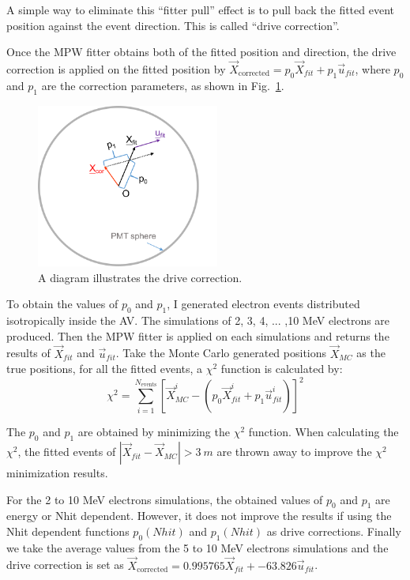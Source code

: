 A simple way to eliminate this ``fitter pull'' effect is to pull back the fitted event position against the event direction. This is called ``drive correction''.   

Once the MPW fitter obtains both of the fitted position and direction, the drive correction is applied on the fitted position by $\vec{X}_{\mathrm{corrected}} = p_0\vec{X}_{fit}+p_1\vec{u}_{fit}$, where $p_0$ and $p_1$ are the correction parameters, as shown in Fig.~\ref{drivecor}.
\begin{figure}[!htb]
	\centering
	\includegraphics[width=6cm]{driveCor.png}
	\caption{ A diagram illustrates the drive correction.}
	\label{drivecor}
\end{figure}

To obtain the values of $p_0$ and $p_1$, I generated electron events distributed isotropically inside the AV. The simulations of 2, 3, 4, ... ,10 MeV electrons are produced. Then the MPW fitter is applied on each simulations and returns the results of $\vec{X}_{fit}$ and $\vec{u}_{fit}$. Take the Monte Carlo generated positions $\vec{X}_{MC}$ as the true positions, for all the fitted events, a $\chi^2$ function is calculated by:
\[
\chi^2 = \sum_{i=1}^{N_{\mathrm{events}}}[\vec{X}^i_{MC}-(p_0\vec{X}^i_{fit}+p_1\vec{u}^i_{fit})]^2
\]

The $p_0$ and $p_1$ are obtained by minimizing the $\chi^2$ function. When calculating the $\chi^2$, the fitted events of $|\vec{X}_{fit}-\vec{X}_{MC}|>3~m$ are thrown away to improve the $\chi^2$ minimization results.

For the 2 to 10 MeV electrons simulations, the obtained values of $p_0$ and $p_1$ are energy or Nhit dependent. However, it does not improve the results if using the Nhit dependent functions $p_0(Nhit)$ and $p_1(Nhit)$ as drive corrections.
Finally we take the average values from the 5 to 10 MeV electrons simulations and the drive correction is set as $\vec{X}_{\mathrm{corrected}} = 0.995765\vec{X}_{fit}+-63.826\vec{u}_{fit}$.

